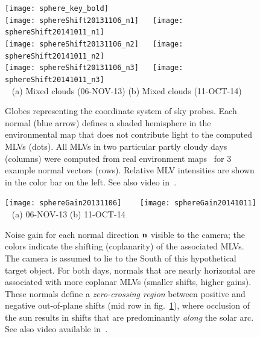 \begin{figure}[t]
\centering
\hspace{3.1cm} \texttt{[image: sphere\_key\_bold]} \\[-1mm]
\texttt{[image: sphereShift20131106\_n1]} \ \ %
\texttt{[image: sphereShift20141011\_n1]} \\[3mm]
\texttt{[image: sphereShift20131106\_n2]} \ \ %
\texttt{[image: sphereShift20141011\_n2]} \\[3mm]
\texttt{[image: sphereShift20131106\_n3]} \ \ %
\texttt{[image: sphereShift20141011\_n3]} \\[2mm]
{\footnotesize {\verb| |} \hspace{0.5cm} (a) Mixed clouds (06-NOV-13) \hspace{0.25cm} (b) Mixed clouds (11-OCT-14) }\\
\caption[Examples of mean light vectors in function of the normal studied]{Globes representing the coordinate system of sky probes. Each normal (blue arrow) defines a shaded hemisphere in the environmental map that does not contribute light to the computed MLVs (dots). All MLVs in two particular partly cloudy days (columns) were computed from real environment maps~\cite{holdgeoffroy-iccp-15} for 3 example normal vectors (rows). Relative MLV intensities are shown in the color bar on the left. See also video in~\cite{webpageXhourPS}.}
\label{fig:realShiftNormal}
\vspace{-3mm}
\end{figure}
\begin{figure}[!ht]
\centering
\texttt{[image: sphereGain20131106]} \ \ \ %
\texttt{[image: sphereGain20141011]} \\[1mm]
{\footnotesize {\verb| |} \hspace{.6cm} (a) 06-NOV-13 \hspace{1cm} (b) 11-OCT-14 }\\[3mm]
\caption[Noise gain over the sphere]{Noise gain for each normal direction ${\bf n}$ visible to the camera; the colors indicate the shifting (coplanarity) of the associated MLVs. The camera is assumed to lie to the South of this hypothetical target object. For both days, normals that are nearly horizontal are associated with more coplanar MLVs (smaller shifts, higher gains). These normals define a {\em zero-crossing region} between positive and negative out-of-plane shifts (mid row in fig.~\ref{fig:realShiftNormal}), where occlusion of the sun results in shifts that are predominantly {\em along} the solar arc. See also video available in~\cite{webpageXhourPS}.}
\label{fig:realShiftAll}
\vspace{-3mm}
\end{figure}
